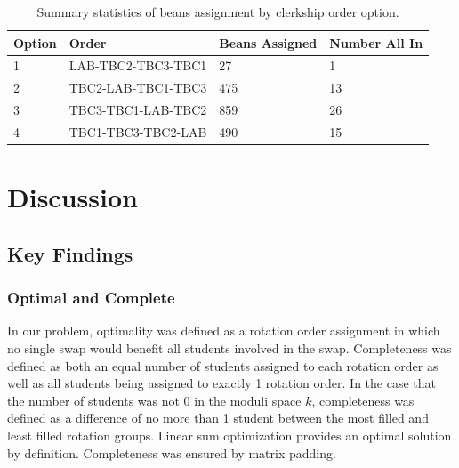 \documentclass{article}
\begin{document}
\begin{table}[h]
\centering
\begin{tabular}{@{}llll@{}}
\toprule
Option & Order              & Beans Assigned & Number All In \\ \midrule
1      & LAB-TBC2-TBC3-TBC1 & 27             & 1             \\
2      & TBC2-LAB-TBC1-TBC3 & 475            & 13            \\
3      & TBC3-TBC1-LAB-TBC2 & 859            & 26            \\
4      & TBC1-TBC3-TBC2-LAB & 490            & 15            \\ \bottomrule
\end{tabular}
\caption{Summary statistics of beans assignment by clerkship order option.}
\label{tab:tab2}
\end{table}

\section{Discussion}
\label{sec:disc}
\subsection{Key Findings}
\subsubsection{Optimal and Complete}
In our problem, optimality was defined as a rotation order assignment in which no single swap would benefit all students involved in the swap. Completeness was defined as both an equal number of students assigned to each rotation order as well as all students being assigned to exactly 1 rotation order. In the case that the number of students was not $0$ in the moduli space $k$, completeness was defined as a difference of no more than 1 student between the most filled and least filled rotation groups. Linear sum optimization provides an optimal solution by definition. Completeness was ensured by matrix padding.
\end{document}
